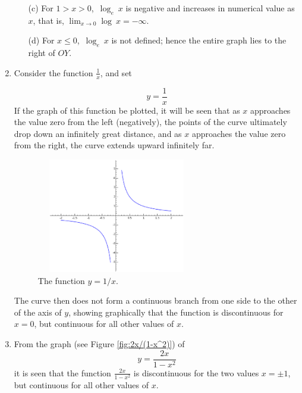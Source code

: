 \begin{enumerate}
\begin{itemize}
\item[(c)] 
For $1 > x > 0$,\ $\log_e\ x$ is negative and increases 
in numerical value as $x$, that is, $\lim_{x \to 0} \log\ x = -\infty$.

\item[(d)] 
For $x \le 0$,\ $\log_e\ x$ is not defined; hence the 
entire graph lies to the right of $OY$.

\end{itemize}


\item
Consider the function $\frac{1}{x}$, and set

\[
    y = \frac{1}{x}
\]
If the graph of this function be plotted, 
it will be seen 
that as $x$ approaches the value zero from the left 
(negatively), the points of the curve ultimately drop 
down an infinitely great distance, and as $x$ approaches the 
value zero from the right, the curve extends upward infinitely far.


\begin{figure}[h!]
\begin{center}
\includegraphics[height=5cm,width=7cm]{recip.eps}
\end{center}
\caption{The function $y=1/x$.}
\label{fig:1/x}
\end{figure}

The curve then does not form a continuous branch from one side 
to the other of the axis of $y$, showing graphically that 
the function is discontinuous for $x = 0$, but continuous for all 
other values of $x$.


\item
From the graph (see Figure \ref{fig:2x/(1-x^2)}) of
\[
    y = \frac{2x}{1 - x^2}
\]
it is seen that the function $  \frac{2x}{1 - x^2}$
is discontinuous for the two values $x = \pm 1$, but 
continuous for all other values of $x$.



\end{enumerate}
